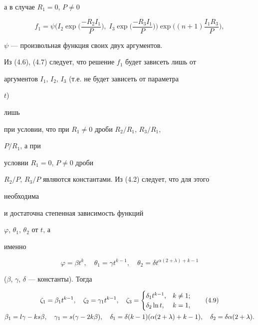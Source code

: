 а в случае $R_1=0$, $P\ne 0$


\begin{equation}


f_1=\psi\biggl(I_2\exp\biggl(\frac{-R_2I_1}{P}\biggr),\;


I_3\exp\biggl(\frac{-R_3I_1}{P}\biggr)\biggr)


\exp\biggl((n+1)\frac{I_1R_3}{P}\biggr),\tag{4.7}


\end{equation}


$\psi$ --- произвольная функция своих двух аргументов.





Из (4.6), (4.7) следует, что решение $f_1$ будет зависеть лишь от


аргументов $I_1$, $I_2$, $I_3$ (т.е. не будет зависеть от параметра


$t$)


лишь


при условии, что при $R_1\ne 0$ дроби $R_2/R_1$, $R_3/R_1$,


$P/R_1$, а при


условии $R_1=0$, $P\ne 0$ дроби


$R_2/P$, $R_3/P$ являются константами. Из (4.2) следует, что для этого


необходима


и достаточна степенная зависимость функций


$\varphi$, $\theta_1$, $\theta_2$ от $t$, а


именно


\begin{equation}


\varphi=\beta t^k,\quad \theta_1=\gamma t^{k-1},\quad


\theta_2=\delta t^{\alpha(2+\lambda)+k-1} \tag{4.8}


\end{equation}


($\beta$, $\gamma$, $\delta$ --- константы). Тогда


\begin{gather}


\zeta_1=\beta_1t^{k-1},\quad \zeta_2=\gamma_1t^{k-1},\quad


\zeta_3=


\begin{cases}


\delta_1t^{k-1},& k\ne 1;\\


\delta_2\ln t,& k=1,


\end{cases}


\tag{4.9}\\


\beta_1=l\gamma-ks\beta,\quad


\gamma_1=s(\gamma-2k\beta),\quad


\delta_1=\delta(k-1)(\alpha(2+\lambda)+k-1),\quad


\delta_2=\delta\alpha(2+\lambda).\notag


\end{gather}





